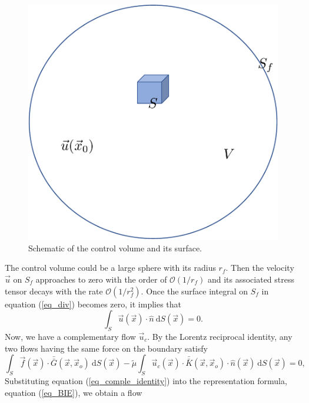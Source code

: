 \begin{figure}[h]
	\begin{center}
		\includegraphics[scale=0.4]{./figures/fig_dlp_volume}
		\vspace{0.5cm}
	\caption{Schematic of the control volume and its surface.}
	\label{fig_dlp_volume}
\end{center}
\end{figure}
The control volume could be a large sphere with its radius $r_f$. Then the velocity $\vec{u}$ on $S_f$ approaches to zero with the order of $\mathcal{O}(1/r_f)$ and its associated stress tensor decays with the rate $\mathcal{O} (1/r_f^2)$. Once the surface integral on $S_f$ in equation (\ref{eq_div}) becomes zero, it implies that
\[
\int_{S} \vec{u}(\vec{x}) \cdot \hat{n} \ \text{d}S(\vec{x}) = 0.
\]
Now, we have a complementary flow $\vec{u}_c$.  By the Lorentz reciprocal identity, any two flows having the same force on the boundary satisfy
\begin{equation}
	\int_{S}  \vec{f}(\vec{x}) \cdot \bar{\bar{G}}(\vec{x},\vec{x}_o) \ \text{d}S(\vec{x})  
	- \tilde{\mu} \int_S
	  \vec{u}_c(\vec{x}) \cdot  \bar{\bar{K}}(\vec{x},\vec{x}_o) 
	  \cdot \hat{n} ( \vec{x})
	  \ \text{d}S(\vec{x})
	  =0,
	  \label{eq_comple_identity}
\end{equation}
Substituting equation (\ref{eq_comple_identity}) into the representation formula, equation (\ref{eq_BIE}), we obtain a flow
